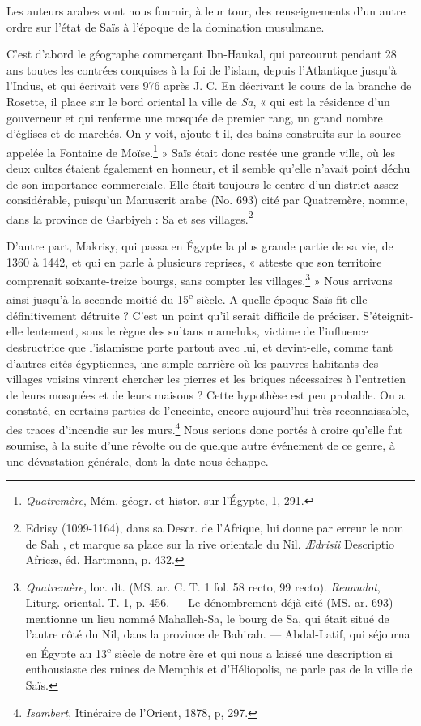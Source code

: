 \documentclass[a4paper, 11pt, oneside]{article}
\begin{document}
Les auteurs arabes vont nous fournir, à leur tour, des renseignements d'un autre ordre sur l'état de Saïs à l'époque de la domination musulmane.

C'est d'abord le géographe commerçant Ibn-Haukal, qui parcourut pendant 28 ans toutes les contrées conquises à la foi de l'islam, depuis l'Atlantique jusqu'à l'Indus, et qui écrivait vers 976 après J. C. En décrivant le cours de la branche de Rosette, il place sur le bord oriental la ville de \emph{Sa}, « qui est la résidence d'un gouverneur et qui renferme une mosquée de premier rang, un grand nombre d'églises et de marchés. On y voit, ajoute-t-il, des bains construits sur la source appelée la Fontaine de Moïse.\footnote{\emph{Quatremère}, Mém. géogr. et histor. sur l'Égypte, 1, 291.} » Saïs était donc restée une grande ville, où les deux cultes étaient également en honneur, et il semble qu'elle n'avait point déchu de son importance commerciale. Elle était toujours le centre d'un district assez considérable, puisqu'un Manuscrit arabe (No. 693) cité par Quatremère, nomme, dans la province de Garbiyeh : Sa et ses villages.\footnote{Edrisy (1099-1164), dans sa Descr. de l'Afrique, lui donne par erreur le nom de Sah , et marque sa place sur la rive orientale du Nil. \emph{Ædrisii} Descriptio Africæ, éd. Hartmann, p. 432.}

D'autre part, Makrisy, qui passa en Égypte la plus grande partie de sa vie, de 1360 à 1442, et qui en parle à plusieurs reprises, « atteste que son territoire comprenait soixante-treize bourgs, sans compter les villages.\footnote{\emph{Quatremère}, loc. dt. (MS. ar. C. T. 1 fol. 58 recto, 99 recto). \emph{Renaudot}, Liturg. oriental. T. 1, p. 456. --- Le dénombrement déjà cité (MS. ar. 693) mentionne un lieu nommé Mahalleh-Sa, le bourg de Sa, qui était situé de l'autre côté du Nil, dans la province de Bahirah. --- Abdal-Latif, qui séjourna en Égypte au 13\textsuperscript{e} siècle de notre ère et qui nous a laissé une description si enthousiaste des ruines de Memphis et d'Héliopolis, ne parle pas de la ville de Saïs.} »
\clearpage
Nous arrivons ainsi jusqu'à la seconde moitié du 15\textsuperscript{e} siècle. A quelle époque Saïs fit-elle définitivement détruite ? C'est un point qu'il serait difficile de préciser. S'éteignit-elle lentement, sous le règne des sultans mameluks, victime de l'influence destructrice que l'islamisme porte partout avec lui, et devint-elle, comme tant d'autres cités égyptiennes, une simple carrière où les pauvres habitants des villages voisins vinrent chercher les pierres et les briques nécessaires à l'entretien de leurs mosquées et de leurs maisons ? Cette hypothèse est peu probable. On a constaté, en certains parties de l'enceinte, encore aujourd'hui très reconnaissable, des traces d'incendie sur les murs.\footnote{\emph{Isambert}, Itinéraire de l'Orient, 1878, p, 297.} Nous serions donc portés à croire qu'elle fut soumise, à la suite d'une révolte ou de quelque autre événement de ce genre, à une dévastation générale, dont la date nous échappe.
\end{document}
